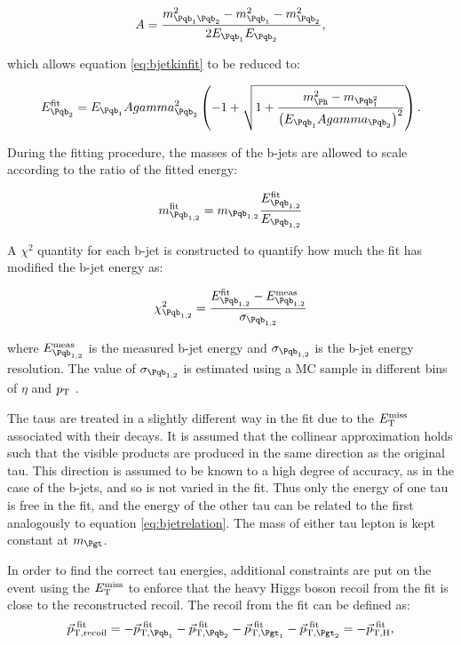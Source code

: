 \begin{equation}
A = \frac{m_{\Pqb_{1}\Pqb_{2}}^{2} - m_{\Pqb_{1}}^{2} - m_{\Pqb_{2}}^{2}}{2E_{\Pqb_{1}}E_{\Pqb_{2}}} , 
\end{equation}

which allows equation \ref{eq:bjetkinfit} to be reduced to:

\begin{equation}
E_{\Pqb_{2}}^{\text{fit}} = E_{\Pqb_{1}}A\gamma_{\Pqb_{2}}^{2}\left(-1 + \sqrt{1 +
\frac{m_{\Ph}^{2} -
m_{\Pqb_{1}^{2}}}{\left(E_{\Pqb_{1}}A\gamma_{\Pqb_{2}}\right)^{2}}}\right) .
\label{eq:bjetrelation}
\end{equation}

During the fitting procedure, the masses of the b-jets are allowed to scale
according to the ratio of the fitted energy:

\begin{equation}
m_{\Pqb_{1,2}}^{\text{fit}} = m_{\Pqb_{1,2}} \frac{E_{\Pqb_{1,2}}^{\text{fit}}}{E_{\Pqb_{1,2}}} 
\end{equation}

A $\chi^{2}$ quantity for each b-jet is constructed to quantify how much the fit has
modified the b-jet energy as:

\begin{equation}
\chi_{\Pqb_{1,2}}^{2} = \frac{E_{\Pqb_{1,2}}^{\text{fit}} -
E_{\Pqb_{1,2}}^{\text{meas}}}{\sigma_{\Pqb_{1,2}}}
\end{equation}

where $E_{\Pqb_{1,2}}^{\text{meas}}$ is the measured b-jet energy and $\sigma_{\Pqb_{1,2}}$
is the b-jet energy resolution. The value of $\sigma_{\Pqb_{1,2}}$ is estimated
using a \ac{MC} sample in different bins of $\eta$ and $p_{\mathrm{T}}$ \cite{Schlieckau}. 

The taus are treated in a slightly different way in the fit due to the $E_{\mathrm{T}}^{\text{miss}}$
associated with their decays. It is assumed that the collinear approximation
holds such that the visible products are produced in the same direction as the
original tau. This direction is assumed to be known to a high degree of
accuracy, as in the case of the b-jets, and so is not varied in the fit. Thus 
only the energy of one tau is free in the fit, and
the energy of the other tau can be related to the first analogously to 
equation \ref{eq:bjetrelation}. The mass of either tau lepton is kept
constant at $m_{\Pgt}$.  

In order to find the correct tau energies, additional constraints are put on
the event using the $E_{\mathrm{T}}^{\text{miss}}$ to enforce that the heavy Higgs boson recoil from the fit
is close to the reconstructed recoil. The recoil from the fit can be defined as:
\begin{equation}
\vec{p}_{\text{T},\text{recoil}}^{\text{~fit}} = -
\vec{p}_{\text{T},\Pqb_{1}}^{\text{~fit}} -
\vec{p}_{\text{T},\Pqb_{2}}^{\text{~fit}} -
\vec{p}_{\text{T},\Pgt_{1}}^{\text{~fit}} - \vec{p}_{\text{T},\Pgt_{2}}^{\text{~fit}} = -
\vec{p}_{\text{T},\text{H}}^{\text{~fit}} ,
\end{equation}

